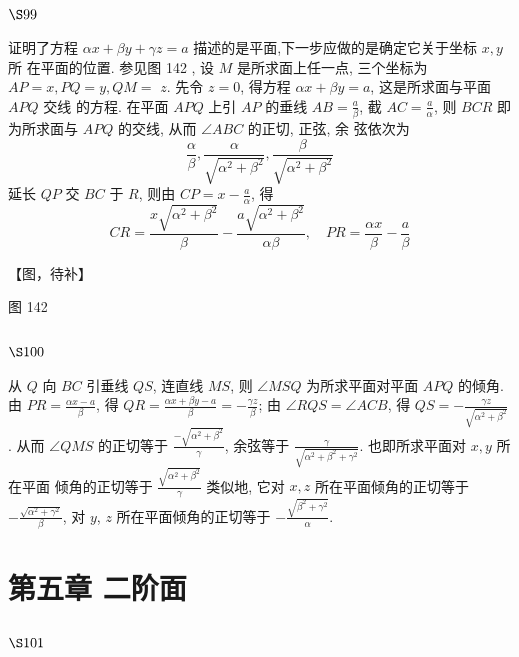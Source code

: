 \section{$\S 99$}

证明了方程 $\alpha x+\beta y+\gamma z=a$ 描述的是平面,下一步应做的是确定它关于坐标 $x, y$ 所 在平面的位置. 参见图 142 , 设 $M$ 是所求面上任一点, 三个坐标为 $A P=x, P Q=y, Q M=$ $z$. 先令 $z=0$, 得方程 $\alpha x+\beta y=a$, 这是所求面与平面 $A P Q$ 交线 的方程. 在平面 $A P Q$ 上引 $A P$ 的垂线 $A B=\frac{a}{\beta}$, 截 $A C=\frac{a}{\alpha}$, 则 $B C R$ 即为所求面与 $A P Q$ 的交线, 从而 $\angle A B C$ 的正切, 正弦, 余 弦依次为
\[
\frac{\alpha}{\beta}, \frac{\alpha}{\sqrt{\alpha^{2}+\beta^{2}}}, \frac{\beta}{\sqrt{\alpha^{2}+\beta^{2}}}
\]
延长 $Q P$ 交 $B C$ 于 $R$, 则由 $C P=x-\frac{a}{\alpha}$, 得
\[
C R=\frac{x \sqrt{\alpha^{2}+\beta^{2}}}{\beta}-\frac{a \sqrt{\alpha^{2}+\beta^{2}}}{\alpha \beta}, \quad P R=\frac{\alpha x}{\beta}-\frac{a}{\beta}
\]

【图，待补】

图 142

\section{$\S 100$}

从 $Q$ 向 $B C$ 引垂线 $Q S$, 连直线 $M S$, 则 $\angle M S Q$ 为所求平面对平面 $A P Q$ 的倾角. 由 $P R=\frac{\alpha x-a}{\beta}$, 得 $Q R=\frac{\alpha x+\beta y-a}{\beta}=-\frac{\gamma z}{\beta}$; 由 $\angle R Q S=\angle A C B$, 得 $Q S=-\frac{\gamma z}{\sqrt{\alpha^{2}+\beta^{2}}}$. 从而 $\angle Q M S$ 的正切等于 $\frac{-\sqrt{\alpha^{2}+\beta^{2}}}{\gamma}$, 余弦等于 $\frac{\gamma}{\sqrt{\alpha^{2}+\beta^{2}+\gamma^{2}}}$. 也即所求平面对 $x, y$ 所在平面 倾角的正切等于 $\frac{\sqrt{\alpha^{2}+\beta^{2}}}{\gamma}$ 类似地, 它对 $x, z$ 所在平面倾角的正切等于 $-\frac{\sqrt{\alpha^{2}+\gamma^{2}}}{\beta}$, 对 $y$, $z$ 所在平面倾角的正切等于 $-\frac{\sqrt{\beta^{2}+\gamma^{2}}}{\alpha}$. 

\chapter{第五章 二阶面}

\section{$\S 101$}

